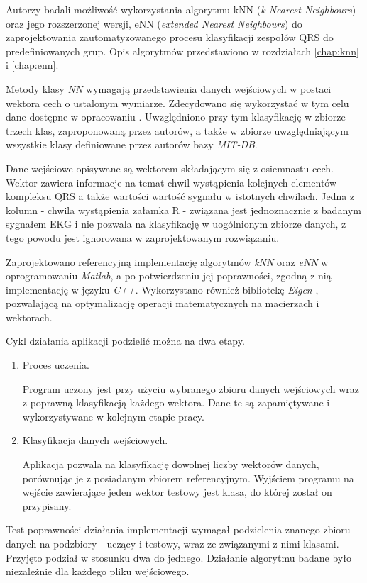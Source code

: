 \documentclass[12pt]{report}
\begin{document}
\large{
Autorzy badali możliwość wykorzystania algorytmu kNN (\textit{k Nearest Neighbours}) oraz jego rozszerzonej wersji, eNN (\textit{extended Nearest Neighbours}) do zaprojektowania zautomatyzowanego procesu klasyfikacji zespołów QRS do predefiniowanych grup. Opis algorytmów przedstawiono w rozdziałach \ref{chap:knn} i \ref{chap:enn}.

Metody klasy \textit{NN} wymagają przedstawienia danych wejściowych w postaci wektora cech o ustalonym wymiarze. Zdecydowano się wykorzystać w tym celu dane dostępne w opracowaniu \cite{heart-class-module}. Uwzględniono przy tym klasyfikację w zbiorze trzech klas, zaproponowaną przez autorów, a także w zbiorze uwzględniającym wszystkie klasy definiowane przez autorów bazy \textit{MIT-DB}.

Dane wejściowe opisywane są wektorem składającym się z osiemnastu cech. Wektor zawiera informacje na temat chwil wystąpienia kolejnych elementów kompleksu QRS a także wartości wartość sygnału w istotnych chwilach. Jedna z kolumn - chwila wystąpienia załamka R - związana jest jednoznacznie z badanym sygnałem EKG i nie pozwala na klasyfikację w uogólnionym zbiorze danych, z tego powodu jest ignorowana w zaprojektowanym rozwiązaniu.

Zaprojektowano referencyjną implementację algorytmów \textit{kNN} oraz \textit{eNN} w oprogramowaniu \textit{Matlab}, a po potwierdzeniu jej poprawności, zgodną z nią implementację w języku \textit{C++}. Wykorzystano również bibliotekę \textit{Eigen} \cite{eigen-www}, pozwalającą na optymalizację operacji matematycznych na macierzach i wektorach.

Cykl działania aplikacji podzielić można na dwa etapy.
\begin{enumerate}
	\item Proces uczenia.

Program uczony jest przy użyciu wybranego zbioru danych wejściowych wraz z poprawną klasyfikacją każdego wektora. Dane te są zapamiętywane i wykorzystywane w kolejnym etapie pracy.			
	
	\item
	Klasyfikacja danych wejściowych.
	
Aplikacja pozwala na klasyfikację dowolnej liczby wektorów danych, porównując je z posiadanym zbiorem referencyjnym. Wyjściem programu na wejście zawierające jeden wektor testowy jest klasa, do której został on przypisany.
\end{enumerate}

Test poprawności działania implementacji wymagał podzielenia znanego zbioru danych na podzbiory - uczący i testowy, wraz ze związanymi z nimi klasami. Przyjęto podział w stosunku dwa do jednego. Działanie algorytmu badane było niezależnie dla każdego pliku wejściowego.
}
\end{document}

